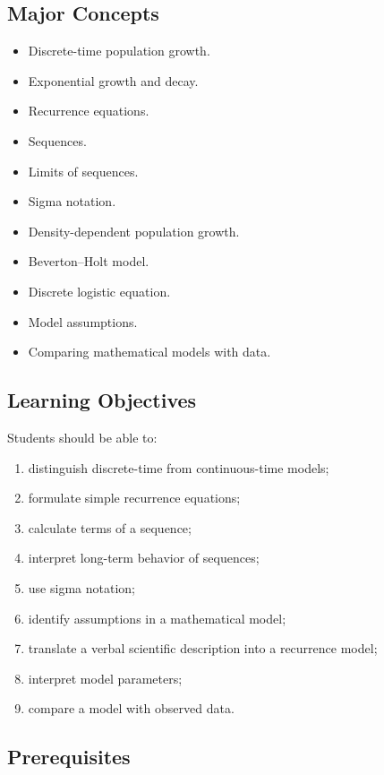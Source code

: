 \documentclass[11pt]{article}
\begin{document}
\subsection{Major Concepts}

\begin{itemize}
    \item Discrete-time population growth.
    \item Exponential growth and decay.
    \item Recurrence equations.
    \item Sequences.
    \item Limits of sequences.
    \item Sigma notation.
    \item Density-dependent population growth.
    \item Beverton--Holt model.
    \item Discrete logistic equation.
    \item Model assumptions.
    \item Comparing mathematical models with data.
\end{itemize}

\subsection{Learning Objectives}

Students should be able to:

\begin{enumerate}
    \item distinguish discrete-time from continuous-time models;
    \item formulate simple recurrence equations;
    \item calculate terms of a sequence;
    \item interpret long-term behavior of sequences;
    \item use sigma notation;
    \item identify assumptions in a mathematical model;
    \item translate a verbal scientific description into a recurrence model;
    \item interpret model parameters;
    \item compare a model with observed data.
\end{enumerate}

\subsection{Prerequisites}
\end{document}
